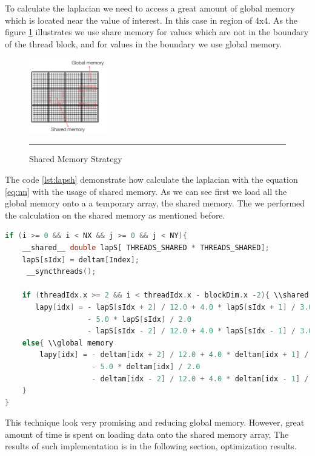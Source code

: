 To calculate the laplacian we need to access a great amount of global memory which is located near the value of interest. In this case in region of 4x4. As the figure \ref{fig:shared} illustrates we use share memory for values which are not in the boundary of the thread block, and for values in the boundary we use global memory.

\begin{figure}[htbp]
	\centering
		\includegraphics[width=0.3\textwidth]{Figures/shared.png}
		\rule{35em}{0.2pt}
	\caption[Shared Memory Strategy]{Shared Memory Strategy }
	\label{fig:shared}
\end{figure}

The code \ref{lst:lapsh} demonstrate how calculate the laplacian with the equation \ref{eq:nn} with the usage of shared memory. As we can see first we load all the global memory onto a a temporary array, the shared memory. The we performed the calculation on the shared memory as mentioned before.

\begin{lstlisting}[language=C++, label={lst:lapsh}, caption={Laplacian evaluating using shared memory with boundaries condition}]
if (i >= 0 && i < NX && j >= 0 && j < NY){
    __shared__ double lapS[ THREADS_SHARED * THREADS_SHARED];
    lapS[sIdx] = deltam[Index];
     __syncthreads();

    if (threadIdx.x >= 2 && i < threadIdx.x - blockDim.x -2){ \\shared
       lapy[idx] = - lapS[sIdx + 2] / 12.0 + 4.0 * lapS[sIdx + 1] / 3.0
			  	   - 5.0 * lapS[sIdx] / 2.0
			  	   - lapS[sIdx - 2] / 12.0 + 4.0 * lapS[sIdx - 1] / 3.0;
	else{ \\global memory
		lapy[idx] = - deltam[idx + 2] / 12.0 + 4.0 * deltam[idx + 1] / 3.0
			  		- 5.0 * deltam[idx] / 2.0
			  		- deltam[idx - 2] / 12.0 + 4.0 * deltam[idx - 1] / 3.0;
	}
}
\end{lstlisting}

This technique look very promising and reducing global memory. However, great amount of time is spent on loading data onto the shared memory array, The results of such implementation is in the following section, optimization results.

